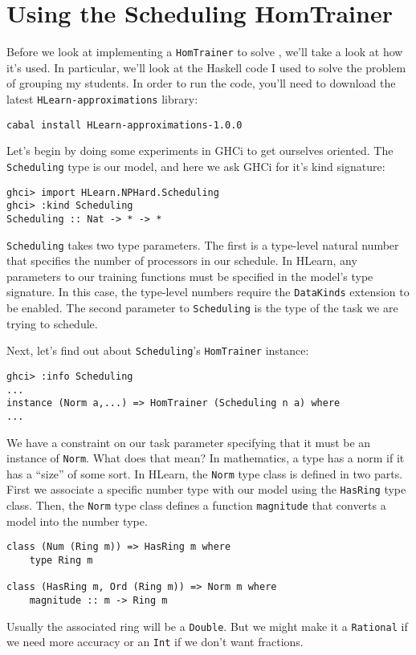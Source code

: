 \documentclass[tikz]{tmr}
\newcommand\h{\lstinline}
\newcommand{\prob}[1]{{\sc {#1}}}
\newcommand\+{\mdoubleplus}
\begin{document}
\section {Using the Scheduling HomTrainer}


Before we look at implementing a \h{HomTrainer} to solve \prob{Scheduling}, we'll take a look at how it's used.
In particular, we'll look at the Haskell code I used to solve the problem of grouping my students.
In order to run the code, you'll need to download the latest \h{HLearn-approximations} library:

\begin{lstlisting}
cabal install HLearn-approximations-1.0.0
\end{lstlisting}

Let's begin by doing some experiments in GHCi to get ourselves oriented.
The \h{Scheduling} type is our model, and here we ask GHCi for it's kind signature:
\begin{lstlisting}
ghci> import HLearn.NPHard.Scheduling
ghci> :kind Scheduling
Scheduling :: Nat -> * -> *
\end{lstlisting}
\h{Scheduling} takes two type parameters.
The first is a type-level natural number that specifies the number of processors in our schedule.
In HLearn, any parameters to our training functions must be specified in the model's type signature.
In this case, the type-level numbers require the \h{DataKinds} extension to be enabled.
The second parameter to \h{Scheduling} is the type of the task we are trying to schedule.

Next, let's find out about \h{Scheduling}'s \h{HomTrainer} instance:
\begin{lstlisting}
ghci> :info Scheduling
...
instance (Norm a,...) => HomTrainer (Scheduling n a) where
...
\end{lstlisting}
We have a constraint on our task parameter specifying that it must be an instance of \h{Norm}.
What does that mean?
In mathematics, a type has a norm if it has a ``size'' of some sort. 
In HLearn, the \h{Norm} type class is defined in two parts.
First we associate a specific number type with our model using the \h{HasRing} type class.
Then, the \h{Norm} type class defines a function \h{magnitude} that converts a model into the number type.
\begin{lstlisting}
class (Num (Ring m)) => HasRing m where
    type Ring m

class (HasRing m, Ord (Ring m)) => Norm m where
    magnitude :: m -> Ring m
\end{lstlisting}
Usually the associated ring will be a \h{Double}.
But we might make it a \h{Rational} if we need more accuracy or an \h{Int} if we don't want fractions.
\end{document}
